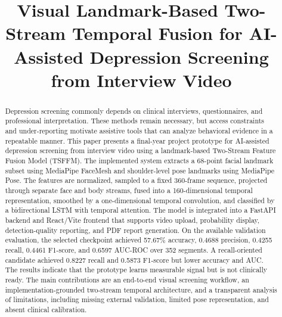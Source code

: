 \documentclass[conference]{IEEEtran}
\begin{document}
\title{Visual Landmark-Based Two-Stream Temporal Fusion for AI-Assisted Depression Screening from Interview Video}

\author{
}

\maketitle

\begin{abstract}
Depression screening commonly depends on clinical interviews, questionnaires, and professional interpretation. These methods remain necessary, but access constraints and under-reporting motivate assistive tools that can analyze behavioral evidence in a repeatable manner. This paper presents a final-year project prototype for AI-assisted depression screening from interview video using a landmark-based Two-Stream Feature Fusion Model (TSFFM). The implemented system extracts a 68-point facial landmark subset using MediaPipe FaceMesh and shoulder-level pose landmarks using MediaPipe Pose. The features are normalized, sampled to a fixed 360-frame sequence, projected through separate face and body streams, fused into a 160-dimensional temporal representation, smoothed by a one-dimensional temporal convolution, and classified by a bidirectional LSTM with temporal attention. The model is integrated into a FastAPI backend and React/Vite frontend that supports video upload, probability display, detection-quality reporting, and PDF report generation. On the available validation evaluation, the selected checkpoint achieved 57.67\% accuracy, 0.4688 precision, 0.4255 recall, 0.4461 F1-score, and 0.6597 AUC-ROC over 352 segments. A recall-oriented candidate achieved 0.8227 recall and 0.5873 F1-score but lower accuracy and AUC. The results indicate that the prototype learns measurable signal but is not clinically ready. The main contributions are an end-to-end visual screening workflow, an implementation-grounded two-stream temporal architecture, and a transparent analysis of limitations, including missing external validation, limited pose representation, and absent clinical calibration.
\end{abstract}
\end{document}
